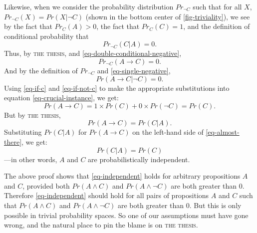 Likewise, when we consider the probability distribution $Pr_{\neg C}$ such that for all $X$, $Pr_{\neg C}(X) = Pr(X|\neg C)$ (shown in the bottom center of \autoref{fig-triviality}), we see by the fact that $Pr_C(A) >0$, the fact that $Pr_C(C) =1$, and the definition of conditional probability that
%
\begin{equation}
\label{eq-double-conditional-negative}
Pr_{\neg C}(C|A) = 0.
\end{equation}
%
Thus, by \textsc{the thesis}, and \autoref{eq-double-conditional-negative},
%
\begin{equation}
\label{eq-single-negative}
Pr_{\neg C}(A \rightarrow C) = 0.
\end{equation}
%
And by the definition of $Pr_{\neg C}$ and \autoref{eq-single-negative},
\begin{equation}
\label{eq-if-not-c}Pr(A \rightarrow C|\neg C) = 0.
\end{equation}
%
Using \autoref{eq-if-c} and \autoref{eq-if-not-c} to make the appropriate substitutions into equation \autoref{eq-crucial-instance}, we get:
%
\begin{equation}
\label{eq-almost-there}
Pr(A \rightarrow C) = 1 \times Pr(C) + 0 \times Pr(\neg C) = Pr(C).
\end{equation}
%
But by \textsc{the thesis},
%
\begin{equation}
Pr(A \rightarrow C) = Pr(C|A).
\end{equation}
%
Substituting $Pr(C|A)$ for $Pr(A \rightarrow C)$ on the left-hand side of \autoref{eq-almost-there}, we get:
%
\begin{equation}
\label{eq-independent}
Pr(C|A) = Pr(C)
\end{equation}
%
---in other words, $A$ and $C$ are probabilistically independent.

The above proof shows that \autoref{eq-independent} holds for arbitrary propositions $A$ and $C$, provided both $Pr(A \wedge C)$ and $Pr(A \wedge \neg C)$ are both greater than 0.  Therefore \autoref{eq-independent} should hold for all pairs of propositions $A$ and $C$ such that $Pr(A \wedge C)$ and $Pr(A \wedge \neg C)$ are both greater than 0.  But this is only possible in trivial probability spaces.  So one of our assumptions must have gone wrong, and the natural place to pin the blame is on \textsc{the thesis}.

